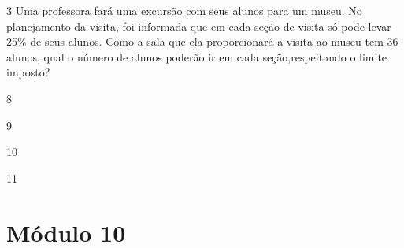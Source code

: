 %
%
%
%
%
%
%
%


\num{3} Uma professora fará uma excursão com seus alunos para um museu. No
planejamento da visita, foi informada que em cada seção de visita só
pode levar 25\% de seus alunos. Como a sala que ela proporcionará a
visita ao museu tem 36 alunos, qual o número de alunos poderão ir em
cada seção,respeitando o limite imposto?

\begin{escolha}
\item
  8
\item
  9
\item
  10
\item
  11
\end{escolha}


\chapter{Módulo 10}

